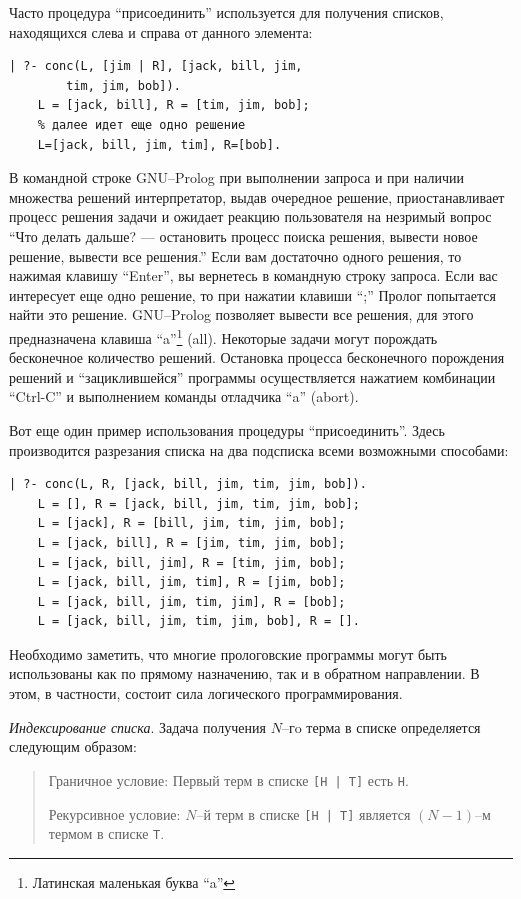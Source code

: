 \documentclass[12pt, openany, twoside]{book} %
\begin{document}
Часто процедура ``присоединить'' используется для получения списков, находящихся слева и справа от данного элемента:
{\tt\begin{verbatim}
| ?- conc(L, [jim | R], [jack, bill, jim,
        tim, jim, bob]).
    L = [jack, bill], R = [tim, jim, bob];
    % далее идет еще одно решение
    L=[jack, bill, jim, tim], R=[bob].
\end{verbatim}}
В командной строке GNU--Prolog при выполнении запроса и при наличии множества решений интерпретатор, выдав очередное решение, приостанавливает процесс решения задачи и ожидает реакцию пользователя на незримый вопрос ``Что делать дальше? --- остановить процесс поиска решения, вывести новое решение, вывести все решения.'' Если вам достаточно одного решения, то нажимая клавишу ``Enter'', вы вернетесь в командную строку запроса. Если вас интересует еще одно решение, то при нажатии клавиши ``;'' Пролог попытается найти это решение. GNU--Prolog позволяет вывести все решения, для этого предназначена клавиша ``a''\footnote{Латинская маленькая буква ``a''} (all). Некоторые задачи могут порождать бесконечное количество решений. Остановка процесса бесконечного порождения решений и ``зациклившейся'' программы осуществляется нажатием комбинации ``Ctrl-C'' и выполнением команды отладчика ``a'' (abort).

Вот еще один пример использования процедуры ``присоединить''. Здесь производится разрезания списка на два подсписка всеми возможными способами:
{\tt\begin{verbatim}
| ?- conc(L, R, [jack, bill, jim, tim, jim, bob]).
    L = [], R = [jack, bill, jim, tim, jim, bob];
    L = [jack], R = [bill, jim, tim, jim, bob];
    L = [jack, bill], R = [jim, tim, jim, bob];
    L = [jack, bill, jim], R = [tim, jim, bob];
    L = [jack, bill, jim, tim], R = [jim, bob];
    L = [jack, bill, jim, tim, jim], R = [bob];
    L = [jack, bill, jim, tim, jim, bob], R = [].
\end{verbatim}}
Необходимо заметить, что многие прологовские программы могут быть использованы как по прямому назначению, так и в обратном направлении. В этом, в частности, состоит сила логического программирования.

\emph{Индексирование списка}. Задача получения $N$--гo терма в списке определяется следующим образом:

\begin{quote}
\noindent Граничное условие: Первый терм в списке {\tt [Н | Т]} есть {\tt Н}.

\noindent Рекурсивное условие: $N$--й терм в списке {\tt [Н | Т]} является $(N-1)$--м термом в списке {\tt Т}.
\end{quote}
\end{document}
